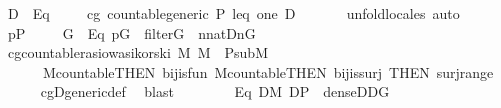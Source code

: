 \begin{isabellebody}
\ {\isacartoucheopen}{\isacharquery}{\kern0pt}D{\isasymin}{\isacharunderscore}{\kern0pt}{\isacartoucheclose}\ \ Eq{}\ \isanewline
\ \ \isamarkupfalse%
\ cg{\isacharcolon}{\kern0pt}\ countable{\isacharunderscore}{\kern0pt}generic\ P\ leq\ one\ {\isacharquery}{\kern0pt}D\ \isanewline
\ \ \ \ \isamarkupfalse%
\ {\isacharparenleft}{\kern0pt}unfold{\isacharunderscore}{\kern0pt}locales{\isacharcomma}{\kern0pt}\ auto{\isacharparenright}{\kern0pt}\isanewline
\ \ \isamarkupfalse%
\ {\isacartoucheopen}p{\isasymin}P{\isacartoucheclose}\ \isanewline
\ \ \isamarkupfalse%
\ G\ \ Eq{}{\isacharcolon}{\kern0pt}\ {\isachardoublequoteopen}p{\isasymin}G\ {\isasymand}\ filter{\isacharparenleft}{\kern0pt}G{\isacharparenright}{\kern0pt}\ {\isasymand}\ {\isacharparenleft}{\kern0pt}{\isasymforall}n{\isasymin}nat{\isachardot}{\kern0pt}{\isacharparenleft}{\kern0pt}{\isacharquery}{\kern0pt}D{\isacharbackquote}{\kern0pt}n{\isacharparenright}{\kern0pt}{\isasyminter}G{\isasymnoteq}{}{\isacharparenright}{\kern0pt}{\isachardoublequoteclose}\isanewline
\ \ \ \ \isamarkupfalse%
\ cg{\isachardot}{\kern0pt}countable{\isacharunderscore}{\kern0pt}rasiowa{\isacharunderscore}{\kern0pt}sikorski{\isacharbrackleft}{\kern0pt}\ M{\isacharequal}{\kern0pt}{\isachardoublequoteopen}{\isasymlambda}{\isacharunderscore}{\kern0pt}{\isachardot}{\kern0pt}\ M{\isachardoublequoteclose}{\isacharbrackright}{\kern0pt}\ \ P{\isacharunderscore}{\kern0pt}sub{\isacharunderscore}{\kern0pt}M\isanewline
\ \ \ \ \ \ M{\isacharunderscore}{\kern0pt}countable{\isacharbrackleft}{\kern0pt}THEN\ bij{\isacharunderscore}{\kern0pt}is{\isacharunderscore}{\kern0pt}fun{\isacharbrackright}{\kern0pt}\ M{\isacharunderscore}{\kern0pt}countable{\isacharbrackleft}{\kern0pt}THEN\ bij{\isacharunderscore}{\kern0pt}is{\isacharunderscore}{\kern0pt}surj{\isacharcomma}{\kern0pt}\ THEN\ surj{\isacharunderscore}{\kern0pt}range{\isacharbrackright}{\kern0pt}\ \isanewline
\ \ \ \ \isamarkupfalse%
\ cg{\isachardot}{\kern0pt}D{\isacharunderscore}{\kern0pt}generic{\isacharunderscore}{\kern0pt}def\ \isamarkupfalse%
\ blast\isanewline
\ \ \isamarkupfalse%
\ \isanewline
\ \ \isamarkupfalse%
\ Eq{}{\isacharcolon}{\kern0pt}\ {\isachardoublequoteopen}{\isacharparenleft}{\kern0pt}{\isasymforall}D{\isasymin}M{\isachardot}{\kern0pt}\ D{\isasymsubseteq}P\ {\isasymand}\ dense{\isacharparenleft}{\kern0pt}D{\isacharparenright}{\kern0pt}{\isasymlongrightarrow}D{\isasyminter}G{\isasymnoteq}{}{\isacharparenright}{\kern0pt}{\isachardoublequoteclose}\isanewline

\end{isabellebody}
